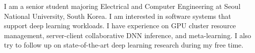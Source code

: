 

\begin{cvparagraph}

I am a senior student majoring Electrical and Computer Engineering at Seoul National University, South Korea. 
I am interested in software systems that support deep learning workloads. 
I have experience on GPU cluster resource management, server-client collaborative DNN inference, and meta-learning.
I also try to follow up on state-of-the-art deep learning research during my free time. 
\end{cvparagraph}
